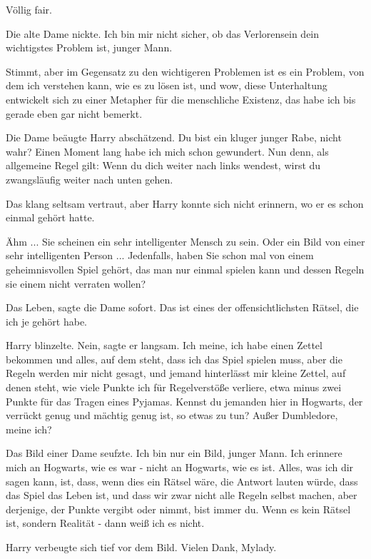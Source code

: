 \glqq{}Völlig fair.\grqq{}

Die alte Dame nickte. \glqq{}Ich bin mir nicht sicher, ob das Verlorensein dein
wichtigstes Problem ist, junger Mann.\grqq{}

\glqq{}Stimmt, aber im Gegensatz zu den wichtigeren Problemen ist es ein Problem,
von dem ich verstehen kann, wie es zu lösen ist, und wow, diese Unterhaltung
entwickelt sich zu einer Metapher für die menschliche Existenz, das habe ich bis
gerade eben gar nicht bemerkt.\grqq{}

Die Dame beäugte Harry abschätzend. \glqq{}Du bist ein kluger junger Rabe, nicht
wahr? Einen Moment lang habe ich mich schon gewundert. Nun denn, als allgemeine
Regel gilt: Wenn du dich weiter nach links wendest, wirst du zwangsläufig weiter
nach unten gehen.\grqq{}

Das klang seltsam vertraut, aber Harry konnte sich nicht erinnern, wo er es
schon einmal gehört hatte.

\glqq{}Ähm ... Sie scheinen ein sehr intelligenter Mensch zu sein. Oder ein Bild
von einer sehr intelligenten Person ... Jedenfalls, haben Sie schon mal von
einem geheimnisvollen Spiel gehört, das man nur einmal spielen kann und dessen
Regeln sie einem nicht verraten wollen?\grqq{}

\glqq{}Das Leben\grqq{}, sagte die Dame sofort. \glqq{}Das ist eines der
offensichtlichsten Rätsel, die ich je gehört habe.\grqq{}

Harry blinzelte. \glqq{}Nein\grqq{}, sagte er langsam. \glqq{}Ich meine, ich habe
einen Zettel bekommen und alles, auf dem steht, dass ich das Spiel spielen muss,
aber die Regeln werden mir nicht gesagt, und jemand hinterlässt mir kleine
Zettel, auf denen steht, wie viele Punkte ich für Regelverstöße verliere, etwa
minus zwei Punkte für das Tragen eines Pyjamas. Kennst du jemanden hier in
Hogwarts, der verrückt genug und mächtig genug ist, so etwas zu tun? Außer
Dumbledore, meine ich?\grqq{}

Das Bild einer Dame seufzte. \glqq{}Ich bin nur ein Bild, junger Mann. Ich
erinnere mich an Hogwarts, wie es war - nicht an Hogwarts, wie es ist. Alles,
was ich dir sagen kann, ist, dass, wenn dies ein Rätsel wäre, die Antwort lauten
würde, dass das Spiel das Leben ist, und dass wir zwar nicht alle Regeln selbst
machen, aber derjenige, der Punkte vergibt oder nimmt, bist immer du. Wenn es
kein Rätsel ist, sondern Realität - dann weiß ich es nicht.\grqq{}

Harry verbeugte sich tief vor dem Bild. \glqq{}Vielen Dank, Mylady.\grqq{}


